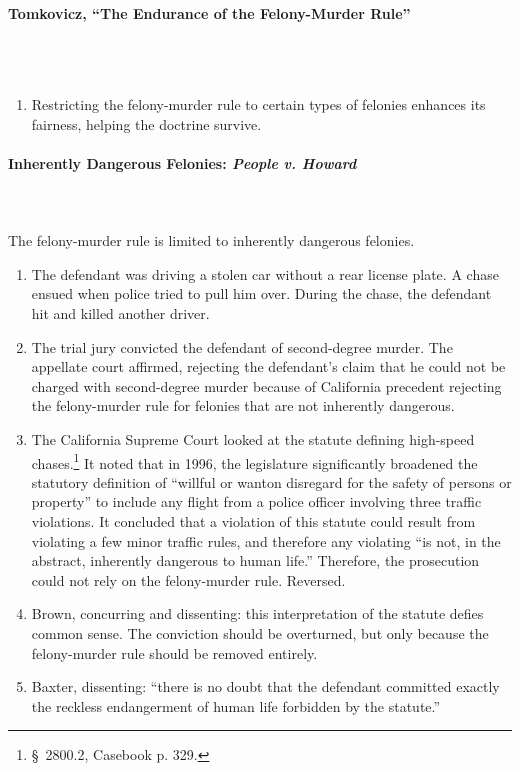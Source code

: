 \paragraph{Tomkovicz, ``The Endurance of the Felony-Murder Rule''}
~\\\\
\begin{enumerate}
    \item Restricting the felony-murder rule to certain types of felonies 
    enhances its fairness, helping the doctrine survive.
\end{enumerate}

\paragraph{Inherently Dangerous Felonies: \emph{People v. Howard}}
~\\\\
The felony-murder rule is limited to inherently dangerous felonies.

\begin{enumerate}
    \item The defendant was driving a stolen car without a rear license plate. 
    A chase ensued when police tried to pull him over. During the chase, the 
    defendant hit and killed another driver.
    \item The trial jury convicted the defendant of second-degree murder. The 
    appellate court affirmed, rejecting the defendant's claim that he could 
    not be charged with second-degree murder because of California precedent 
    rejecting the felony-murder rule for felonies that are not inherently 
    dangerous.
    \item The California Supreme Court looked at the statute defining 
    high-speed chases.\footnote{\S\ 2800.2, Casebook p. 329.} It noted 
    that in 1996, the legislature significantly broadened the statutory 
    definition of ``willful or wanton disregard for the safety of persons or 
    property'' to include any flight from a police officer involving three 
    traffic violations. It concluded that a violation of this statute could 
    result from violating a few minor traffic rules, and therefore any 
    violating ``is not, in the abstract, inherently dangerous to human life.'' 
    Therefore, the prosecution could not rely on the felony-murder rule. 
    Reversed.
    \item Brown, concurring and dissenting: this interpretation of the statute 
    defies common sense. The conviction should be overturned, but only because 
    the felony-murder rule should be removed entirely.
    \item Baxter, dissenting: ``there is no doubt that the defendant committed 
    exactly the reckless endangerment of human life forbidden by the 
    statute.''
\end{enumerate}

